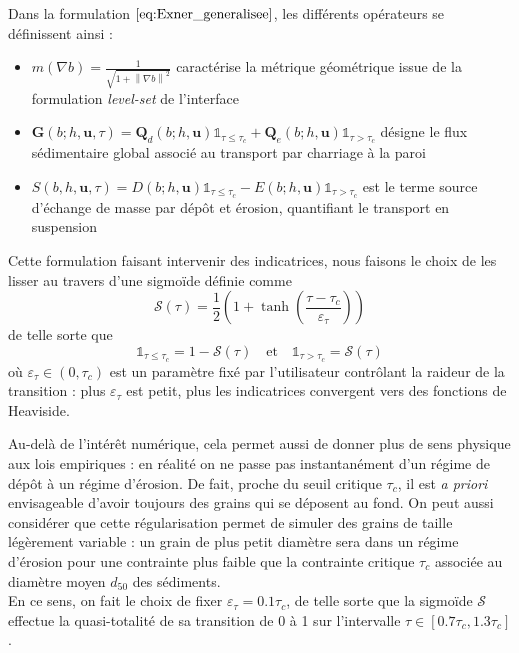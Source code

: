 \documentclass[11pt, a4paper, oneside]{report}
\begin{document}
\begin{samepage}
Dans la formulation $\eqref{eq:Exner_generalisee}$, les différents opérateurs se définissent ainsi :
\begin{itemize}
    \item $\displaystyle m(\nabla b) = \frac{1}{\sqrt{1 + \left\| \nabla b \right\|^2}}$ caractérise la métrique géométrique issue de la formulation \textit{level-set} de l'interface
    \item $\displaystyle \bm{G}(b; h, \bm{u}, \tau) = \bm{Q}_d(b; h, \bm{u}) \mathds{1}_{\tau \leq \tau_c} + \bm{Q}_e(b; h, \bm{u}) \mathds{1}_{\tau > \tau_c}$ désigne le flux sédimentaire global associé au transport par charriage à la paroi
    \item $\displaystyle S(b, h, \bm{u}, \tau) = D(b; h, \bm{u}) \mathds{1}_{\tau \leq \tau_c} - E(b; h, \bm{u}) \mathds{1}_{\tau > \tau_c}$ est le terme source d'échange de masse par dépôt et érosion, quantifiant le transport en suspension
\end{itemize}
Cette formulation faisant intervenir des indicatrices, nous faisons le choix de les lisser au travers d'une sigmoïde définie comme
\begin{equation}
    \mathcal{S}(\tau) = \frac{1}{2} \left( 1 + \tanh \left( \frac{\tau - \tau_c}{\varepsilon_\tau} \right) \right)
\end{equation}
de telle sorte que
\begin{equation}
    \mathds{1}_{\tau \leq \tau_c} = 1 - \mathcal{S}(\tau) \quad \text{et} \quad \mathds{1}_{\tau > \tau_c} = \mathcal{S}(\tau)
\end{equation}
où $\varepsilon_\tau \in (0, \tau_c)$ est un paramètre fixé par l'utilisateur contrôlant la raideur de la transition : plus $\varepsilon_\tau$ est petit, plus les indicatrices convergent vers des fonctions de Heaviside. \\
\end{samepage}
Au-delà de l'intérêt numérique, cela permet aussi de donner plus de sens physique aux lois empiriques : en réalité on ne passe pas instantanément d'un régime de dépôt à un régime d'érosion. De fait, proche du seuil critique $\tau_c$, il est \textit{a priori} envisageable d'avoir toujours des grains qui se déposent au fond. On peut aussi considérer que cette régularisation permet de simuler des grains de taille légèrement variable : un grain de plus petit diamètre sera dans un régime d'érosion pour une contrainte plus faible que la contrainte critique $\tau_c$ associée au diamètre moyen $d_{50}$ des sédiments. \\
En ce sens, on fait le choix de fixer $\varepsilon_\tau = 0.1 \tau_c$, de telle sorte que la sigmoïde $\mathcal{S}$ effectue la quasi-totalité de sa transition de 0 à 1 sur l'intervalle $\tau \in [0.7 \tau_c, 1.3 \tau_c]$.
\end{document}
